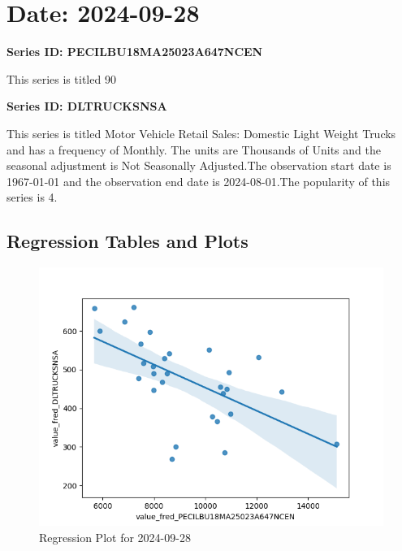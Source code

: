 \section{Date: 2024-09-28}
\noindent \textbf{Series ID: PECILBU18MA25023A647NCEN} 

\noindent This series is titled 90%

\noindent \textbf{Series ID: DLTRUCKSNSA} 

\noindent This series is titled Motor Vehicle Retail Sales: Domestic Light Weight Trucks and has a frequency of Monthly. The units are Thousands of Units and the seasonal adjustment is Not Seasonally Adjusted.The observation start date is 1967-01-01 and the observation end date is 2024-08-01.The popularity of this series is 4. \\ 

\subsection{Regression Tables and Plots}


\begin{figure}
\centering
\includegraphics[scale = 0.9]{plots/plot_2024-09-28.png}
\caption{Regression Plot for 2024-09-28}
\end{figure}
\newpage
